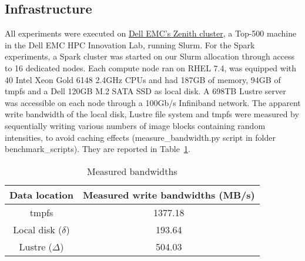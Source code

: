 \documentclass{IEEEtran}
\newcommand{\todo}[1]{\marginpar{\parbox{18mm}{\flushleft\tiny\color{red}\textbf{TODO}:
      #1}}}
\begin{document}





\subsection{Infrastructure} %

 All experiments were executed on  
 \href{https://www.dellemc.com/resources/en-us/asset/sales-documents/products/storage/h16221-hpc-lab-brochure.pdf}{Dell EMC's Zenith 
 cluster}, a Top-500 machine in the Dell EMC HPC Innovation Lab, running 
 Slurm. For the Spark experiments, a Spark cluster was started on our 
 Slurm allocation through access to 16 dedicated nodes. Each compute 
 node ran on RHEL 7.4, was 
 equipped with 40 Intel Xeon Gold 6148 2.4GHz CPUs and had
 187GB of memory, 94GB of tmpfs and a Dell 120GB M.2 SATA SSD as local disk. 
 A 698TB Lustre server was accessible on each node through a 100Gb/s 
 Infiniband network. The apparent write bandwidth of the local disk, 
 Lustre file system and tmpfs were measured by sequentially writing various numbers
 of image blocks containing random intensities, to avoid 
 caching effects (measure\_bandwidth.py script in folder 
 benchmark\_scripts). They are reported in Table~\ref{table:bdwdths}.

\begin{table}
\centering
\begin{tabular}{c|c}
\rowcolor{headcolor}
Data location & Measured write bandwidths (MB/s)\\
\hline
tmpfs                 & 1377.18 \\
Local disk ($\delta$) & 193.64  \\
Lustre   ($\Delta$)   & 504.03 \\
\end{tabular}
\caption{Measured bandwidths}
\label{table:bdwdths}
\end{table}
\end{document}
